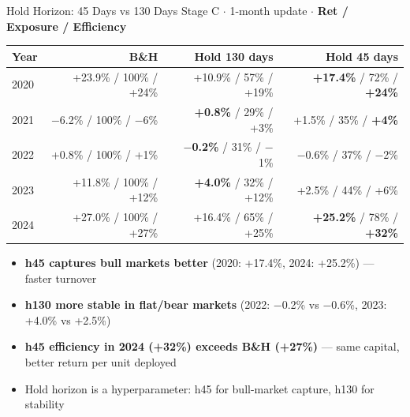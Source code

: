 \documentclass[aspectratio=169]{beamer}
\begin{document}
\begin{frame}{Hold Horizon: 45 Days vs 130 Days}
  \small
  Stage C $\cdot$ 1-month update $\cdot$ \textbf{Ret / Exposure / Efficiency}

  \vspace{0.4em}
  \begin{tabular}{lrrr}
    \toprule
    Year & B\&H & Hold 130 days & Hold 45 days \\
    \midrule
    2020 & +23.9\% / 100\% / +24\% & +10.9\% / 57\% / +19\% & \textbf{+17.4\%} / 72\% / \textbf{+24\%} \\
    2021 & $-$6.2\% / 100\% / $-$6\% & \textbf{+0.8\%} / 29\% / +3\% & +1.5\% / 35\% / \textbf{+4\%} \\
    2022 & +0.8\% / 100\% / +1\% & \textbf{$-$0.2\%} / 31\% / $-$1\% & $-$0.6\% / 37\% / $-$2\% \\
    2023 & +11.8\% / 100\% / +12\% & \textbf{+4.0\%} / 32\% / +12\% & +2.5\% / 44\% / +6\% \\
    2024 & +27.0\% / 100\% / +27\% & +16.4\% / 65\% / +25\% & \textbf{+25.2\%} / 78\% / \textbf{+32\%} \\
    \bottomrule
  \end{tabular}

  \vspace{0.6em}
  \begin{itemize}
    \item \textbf{h45 captures bull markets better} (2020: +17.4\%, 2024: +25.2\%) — faster turnover
    \item \textbf{h130 more stable in flat/bear markets} (2022: $-$0.2\% vs $-$0.6\%, 2023: +4.0\% vs +2.5\%)
    \item \textbf{h45 efficiency in 2024 (+32\%) exceeds B\&H (+27\%)} — same capital, better return per unit deployed
    \item Hold horizon is a hyperparameter: h45 for bull-market capture, h130 for stability
  \end{itemize}
\end{frame}
\end{document}
